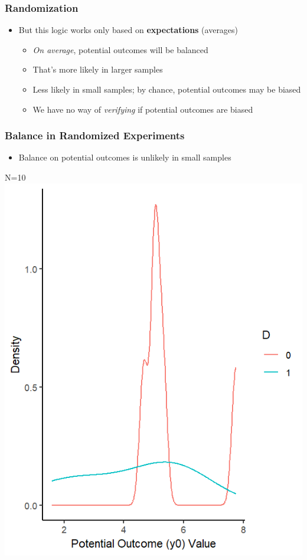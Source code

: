 \documentclass[xcolor=x11names,compress]{beamer}\usepackage[]{graphicx}\usepackage[]{color}
\makeatletter
\def\maxwidth{ %
  \ifdim\Gin@nat@width>\linewidth
    \linewidth
  \else
    \Gin@nat@width
  \fi
}
\newenvironment{knitrout}{}{} %
\renewcommand{\(}{\begin{columns}}
\renewcommand{\)}{\end{columns}}
\newcommand{\<}[1]{\begin{column}{#1}}
\renewcommand{\>}{\end{column}}
\makeatother
\begin{document}
\begin{frame}
\frametitle{Randomization}
\begin{itemize}
\item But this logic works only based on \textbf{expectations} (averages)
\pause
\begin{itemize}
\item \textit{On average}, potential outcomes will be balanced
\pause
\item That's more likely in larger samples
\pause
\item Less likely in small samples; by chance, potential outcomes may be biased
\pause
\item We have no way of \textit{verifying} if potential outcomes are biased
\end{itemize}
\end{itemize}
\end{frame}

\begin{frame}
\frametitle{Balance in Randomized Experiments}
\begin{multicols}{2}
\begin{itemize}
\item Balance on potential outcomes is unlikely in small samples
\end{itemize}
\columnbreak
\pause
N=10
\begin{knitrout}
\color{fgcolor}
\includegraphics[width=\maxwidth]{figure/balance_N1-1} 

\end{knitrout}
\end{multicols}
\end{frame}
\end{document}
